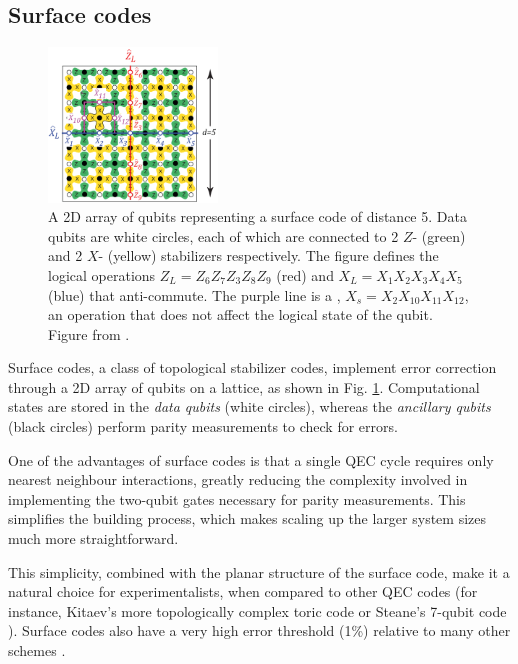 \subsection{Surface codes}
\begin{figure}
  \centering
  \includegraphics[width=0.4\textwidth]{images/surface_code.png}
  \caption{A 2D array of qubits representing a surface code of distance 5. Data
    qubits are white circles, each of which are connected to 2 $Z$- (green)
    and 2 $X$- (yellow) stabilizers respectively. The figure defines the logical
    operations $Z_L = Z_6Z_7Z_3Z_8Z_9$ (red) and $X_L = X_1X_2X_3X_4X_5$ (blue)
    that anti-commute. The purple line is a ,
    $X_s = X_2 X_{10}X_{11} X_{12} $, an operation that does not affect the
    logical state of the qubit. Figure from \cite{fowler12_surfac_codes}.}
  \label{fig:surface_code}
\end{figure}

Surface codes, a class of topological stabilizer codes, implement error
correction through a 2D array of qubits on a lattice, as shown in Fig.
\ref{fig:surface_code}. Computational states are stored in the \textit{data
  qubits} (white circles), whereas the \textit{ancillary qubits} (black circles)
perform parity measurements to check for errors. 

One of the advantages of surface codes is that a single QEC cycle requires only
nearest neighbour interactions, greatly reducing the complexity involved in
implementing the two-qubit gates necessary for parity measurements. This
simplifies the building process, which makes scaling up the larger system sizes
much more straightforward.

This simplicity, combined with the planar structure of the surface code, make it
a natural choice for experimentalists, when compared to other QEC codes (for
instance, Kitaev's more topologically complex toric code \cite{Kitaev_2003} or
Steane's 7-qubit code \cite{Steane_1996_QEC}). Surface codes also have a very
high error threshold (1\%) relative to many other schemes \cite{terhal15}.



